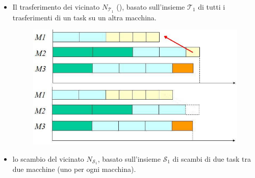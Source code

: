 \documentclass{article}
\begin{document}
\begin{itemize}
    \item Il trasferimento dei vicinato $N_{\mathcal{T}_1}$ (), basato
          sull'insieme $\mathcal{T}_1$ di tutti i trasferimenti di un task su un altra macchina.
          \begin{figure}[H]
              \centering
              \includegraphics[scale=0.5]{images/pmsp_neigh.png}
          \end{figure}
    \item lo scambio del vicinato $N_{\mathcal{S}_1}$, basato sull'insieme $\mathcal{S}_1$
          di scambi di due task tra due macchine (uno per ogni macchina).
\end{itemize}
\end{document}
